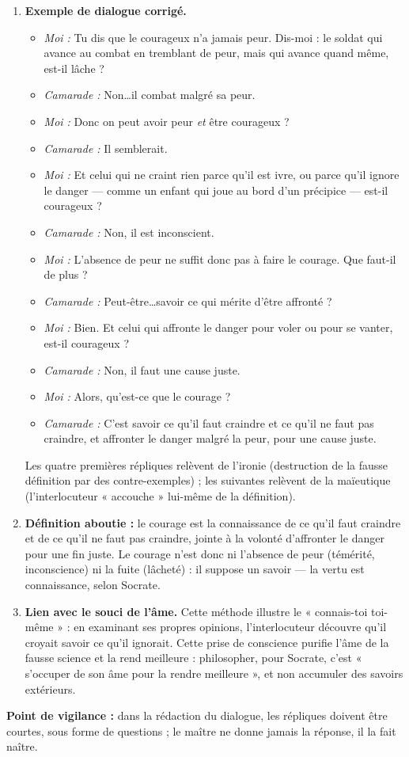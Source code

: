\documentclass[11pt]{article}
\newcommand{\cle}[1]{{\popxbold\color{popdark}#1}}
\begin{document}
\begin{corrige}
\begin{enumerate}
\item \textbf{Exemple de dialogue corrigé.}
\begin{itemize}
\item[] \emph{Moi :} Tu dis que le courageux n'a jamais peur. Dis-moi : le soldat qui avance au combat en tremblant de peur, mais qui avance quand même, est-il lâche ?
\item[] \emph{Camarade :} Non\dots il combat malgré sa peur.
\item[] \emph{Moi :} Donc on peut avoir peur \emph{et} être courageux ?
\item[] \emph{Camarade :} Il semblerait.
\item[] \emph{Moi :} Et celui qui ne craint rien parce qu'il est ivre, ou parce qu'il ignore le danger — comme un enfant qui joue au bord d'un précipice — est-il courageux ?
\item[] \emph{Camarade :} Non, il est inconscient.
\item[] \emph{Moi :} L'absence de peur ne suffit donc pas à faire le courage. Que faut-il de plus ?
\item[] \emph{Camarade :} Peut-être\dots savoir ce qui mérite d'être affronté ?
\item[] \emph{Moi :} Bien. Et celui qui affronte le danger pour voler ou pour se vanter, est-il courageux ?
\item[] \emph{Camarade :} Non, il faut une cause juste.
\item[] \emph{Moi :} Alors, qu'est-ce que le courage ?
\item[] \emph{Camarade :} C'est savoir ce qu'il faut craindre et ce qu'il ne faut pas craindre, et affronter le danger malgré la peur, pour une cause juste.
\end{itemize}
Les quatre premières répliques relèvent de l'\cle{ironie} (destruction de la fausse définition par des contre-exemples) ; les suivantes relèvent de la \cle{maïeutique} (l'interlocuteur « accouche » lui-même de la définition).
\item \textbf{Définition aboutie :} le courage est la connaissance de ce qu'il faut craindre et de ce qu'il ne faut pas craindre, jointe à la volonté d'affronter le danger pour une fin juste. Le courage n'est donc ni l'absence de peur (témérité, inconscience) ni la fuite (lâcheté) : il suppose un savoir — la vertu est connaissance, selon Socrate.
\item \textbf{Lien avec le souci de l'âme.} Cette méthode illustre le « connais-toi toi-même » : en examinant ses propres opinions, l'interlocuteur découvre qu'il croyait savoir ce qu'il ignorait. Cette prise de conscience purifie l'âme de la fausse science et la rend meilleure : philosopher, pour Socrate, c'est « s'occuper de son âme pour la rendre meilleure », et non accumuler des savoirs extérieurs.
\end{enumerate}
\textbf{Point de vigilance :} dans la rédaction du dialogue, les répliques doivent être courtes, sous forme de questions ; le maître ne donne jamais la réponse, il la fait naître.
\end{corrige}
\end{document}

